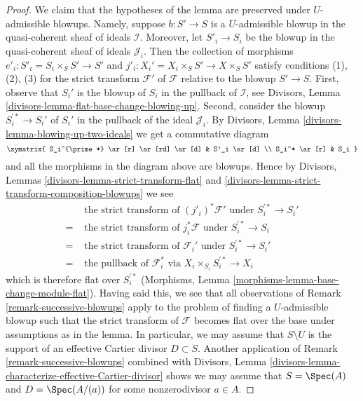 \begin{proof}
We claim that the hypotheses of the lemma are preserved under $U$-admissible
blowups. Namely, suppose $b : S' \to S$ is a $U$-admissible blowup in
the quasi-coherent sheaf of ideals $\mathcal{I}$. Moreover, let $S'_i \to S_i$
be the blowup in the quasi-coherent sheaf of ideals $\mathcal{J}_i$.
Then the collection of morphisms $e'_i : S'_i = S_i \times_S S' \to S'$
and $j'_i : X_i' = X_i \times_S S' \to X \times_S S'$ satisfy conditions
(1), (2), (3) for the strict transform $\mathcal{F}'$ of $\mathcal{F}$
relative to the blowup $S' \to S$. First, observe that $S_i'$ is the
blowup of $S_i$ in the pullback of $\mathcal{I}$, see
Divisors, Lemma \ref{divisors-lemma-flat-base-change-blowing-up}.
Second, consider the blowup
$S_i^{\prime *} \to S_i'$ of $S_i'$ in the pullback of the ideal
$\mathcal{J}_i$.
By Divisors, Lemma \ref{divisors-lemma-blowing-up-two-ideals}
we get a commutative diagram
$$
\xymatrix{
S_i^{\prime *} \ar[r] \ar[rd] \ar[d] & S'_i \ar[d] \\
S_i^* \ar[r] & S_i
}
$$
and all the morphisms in the diagram above are blowups. Hence by
Divisors, Lemmas \ref{divisors-lemma-strict-transform-flat} and
\ref{divisors-lemma-strict-transform-composition-blowups}
we see
\begin{align*}
& \text{ the strict transform of }(j'_i)^*\mathcal{F}'\text{ under }
S_i^{\prime *} \to S_i' \\
= &
\text{ the strict transform of }j_i^*\mathcal{F}\text{ under }
S_i^{\prime *} \to S_i \\
= &
\text{ the strict transform of }\mathcal{F}_i'\text{ under }
S_i^{\prime *} \to S_i' \\
= &
\text{ the pullback of }\mathcal{F}_i^*\text{ via }
X_i \times_{S_i} S_i^{\prime *} \to X_i
\end{align*}
which is therefore flat over $S_i^{\prime *}$
(Morphisms, Lemma \ref{morphisms-lemma-base-change-module-flat}).
Having said this, we see that all observations of
Remark \ref{remark-successive-blowups} apply to the
problem of finding a $U$-admissible blowup such that the
strict transform of $\mathcal{F}$ becomes flat over the base
under assumptions as in the lemma. In particular, we may assume
that $S \setminus U$ is the support of an effective Cartier divisor
$D \subset S$. Another application of Remark \ref{remark-successive-blowups}
combined with
Divisors, Lemma \ref{divisors-lemma-characterize-effective-Cartier-divisor}
shows we may assume that $S = \Spec(A)$ and $D = \Spec(A/(a))$
for some nonzerodivisor $a \in A$.


\end{proof}
